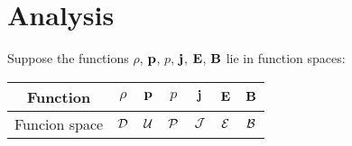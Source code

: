 \section{Analysis}

    Suppose the functions $\rho$, $\mathbf{p}$, $p$, $\mathbf{j}$, $\mathbf{E}$, $\mathbf{B}$ lie in function spaces: 
    \begin{center}\begin{tabular}{ c || c c c c c c }
        Function  &  $\rho$  &  $\mathbf{p}$  &  $p$  &  $\mathbf{j}$  &  $\mathbf{E}$  &  $\mathbf{B}$  \\
        \hline
        Funcion space  &  $\mathcal{D}$  &  $\mathcal{U}$  &  $\mathcal{P}$  &  $\mathcal{J}$  &  $\mathcal{E}$  &  $\mathcal{B}$  \\
    \end{tabular}\end{center}


    
    
    
